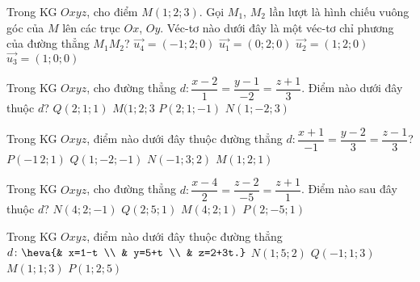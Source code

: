 \begin{ex}%
Trong KG $Oxyz$, cho điểm $M( 1;2;3 )$. Gọi ${M}_{1}$, ${M}_{2}$ lần lượt là hình chiếu vuông góc của $M$ lên các trục $Ox$, $Oy$. Véc-tơ nào dưới đây là một véc-tơ chỉ phương của đường thẳng $M_1M_2$?
\choice
{ \True $\overrightarrow{{{u}_{4}}}=( -1;2;0 )$}
{ $\overrightarrow{{u}_{1}}=( 0;2;0)$}
{  $\overrightarrow {u_2}=( 1;2;0 )$}
{ $\overrightarrow{{{u}_{3}}}=( 1;0;0 )$}
\end{ex}
\begin{ex}%
Trong KG $Oxyz$, cho đường thẳng $d \colon\dfrac{x-2}{1}=\dfrac{y-1}{-2}=\dfrac{z+1}{3}$. Điểm nào dưới đây thuộc $d$?
	\choice
{ $Q( 2;1;1 )$}
{ $M( 1;2;3 $}
{ \True $P( 2;1;-1)$}
{ $N( 1;-2;3) $}
\end{ex}
\begin{ex}%
Trong KG $Oxyz$, điểm nào dưới đây thuộc đường thẳng $d \colon \dfrac{x+1}{-1}=\dfrac{y-2}{3}=\dfrac{z-1}{3}$?
\choice
	{\True $P(-1\,2;1)$}
	{ $Q(1;-2;-1)$}
	{ $N(-1;3;2)$}
	{ $M( 1;2;1)$}
\end{ex}
\begin{ex}%
Trong KG $Oxyz$, cho đường thẳng $d \colon \dfrac{x-4}{2}=\dfrac{z-2}{-5}=\dfrac{z+1}{1}$. Điểm nào sau đây thuộc $d$?
	\choice
	{ \True $N(4;2;-1)$}
	{ $Q(2;5;1)$}
	{ $M(4;2;1)$}
	{ $P(2;-5;1)$}
\end{ex}
\begin{ex}%
Trong KG $Oxyz$, điểm nào dưới đây thuộc đường thẳng $d \colon 
\heva{& x=1-t \\ 
	& y=5+t \\ 
	& z=2+3t.}$
\choice
	{ \True $N(1;5;2)$}
	{ $Q(-1;1;3)$}
	{ $M(1;1;3)$}
	{ $P(1;2;5)$}
\end{ex}

